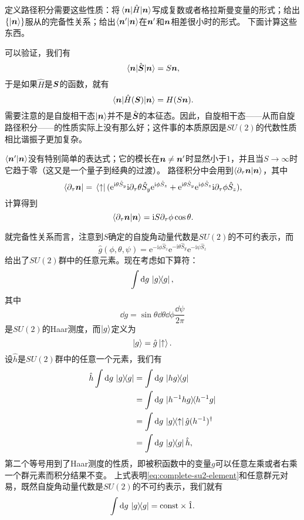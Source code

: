 \documentclass[hyperref, UTF8, a4paper]{ctexart}
\newcommand*{\ii}{\mathrm{i}}
\newcommand*{\ee}{\mathrm{e}}
\newcommand*{\const}{\mathrm{const}}
\begin{document}
定义路径积分需要这些性质：将$\mel*{\vb*{n}}{\hat{H}}{\vb*{n}}$写成复数或者格拉斯曼变量的形式；给出$\{\ket{\vb*{n}}\}$服从的完备性关系；给出$\braket{\vb*{n}'}{\vb*{n}}$在$\vb*{n}'$和$\vb*{n}$相差很小时的形式。
下面计算这些东西。

可以验证，我们有
\begin{equation}
    \mel*{\vb*{n}}{\hat{\vb*{S}}}{\vb*{n}} = S \vb*{n},
\end{equation}
于是如果$\hat{H}$是$\vb*{S}$的函数，就有
\begin{equation}
    \mel*{\vb*{n}}{\hat{H}(\vb*{S})}{\vb*{n}} = H(S \vb*{n}).
    \label{eq:spin-hamiltonian-expect}
\end{equation}
需要注意的是自旋相干态$\ket{\vb*{n}}$并不是$\hat{\vb*{S}}$的本征态。因此，自旋相干态——从而自旋路径积分——的性质实际上没有那么好；这件事的本质原因是$SU(2)$的代数性质相比谐振子更加复杂。

$\braket{\vb*{n}'}{\vb*{n}}$没有特别简单的表达式；它的模长在$\vb*{n} \neq \vb*{n}'$时显然小于$1$，并且当$S \to \infty$时它趋于零（这又是一个量子到经典的过渡）。
路径积分中会用到$\braket{\partial_\tau \vb*{n}}{\vb*{n}}$，其中
\[
    \bra*{\partial_\tau \vb*{n}} = \bra*{\uparrow} (\ee^{\ii \theta \hat{S}_y} \ii \partial_\tau \theta \hat{S}_y \ee^{\ii \phi \hat{S}_z} + \ee^{\ii \theta \hat{S}_y} \ee^{\ii \phi \hat{S}_z} \ii \partial_\tau \phi \hat{S}_z),
\]
计算得到
\begin{equation}
    \braket*{\partial_\tau \vb*{n}}{\vb*{n}} = \ii S \partial_\tau \phi \cos \theta.
    \label{eq:berry-phase-expect}
\end{equation}

就完备性关系而言，注意到$S$确定的自旋角动量代数是$SU(2)$的不可约表示，而
\begin{equation}
    \hat{g}(\phi, \theta, \psi) = \ee^{- \ii \phi \hat{S}_z} \ee^{- \ii \theta \hat{S}_y} \ee^{- \ii \psi \hat{S}_z}
\end{equation}
给出了$SU(2)$群中的任意元素。现在考虑如下算符：
\[
    \int \dd{g} \dyad*{g}{g},
\]
其中
\[
    \dd{g} = \sin \theta \dd{\theta} \dd{\phi} \frac{\dd{\psi}}{2\pi}
\]
是$SU(2)$的Haar测度，而$\ket{g}$定义为
\begin{equation}
    \ket{g} = \hat{g} \ket{\uparrow}.
    \label{eq:complete-su2-element}
\end{equation}
设$\hat{h}$是$SU(2)$群中的任意一个元素，我们有
\[
    \begin{aligned}
        \hat{h} \int \dd{g} \dyad*{g}{g} &= \int \dd{g} \dyad*{h g}{g} \\
        &= \int \dd{g} \dyad*{h^{-1} h g}{h^{-1} g} \\
        &= \int \dd{g} \dyad*{g}{\uparrow} \hat{g} (h^{-1})^\dagger \\
        &= \int \dd{g} \dyad*{g}{g} \hat{h},
    \end{aligned}
\]
第二个等号用到了Haar测度的性质，即被积函数中的变量$g$可以任意左乘或者右乘一个群元素而积分结果不变。
上式表明\eqref{eq:complete-su2-element}和任意群元对易，既然自旋角动量代数是$SU(2)$的不可约表示，我们就有
\[
    \int \dd{g} \dyad*{g}{g} = \const \times \hat{1}. 
\]
\end{document}
